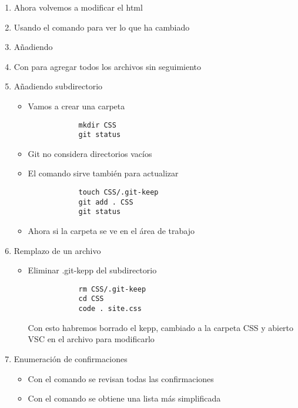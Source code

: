 \begin{enumerate}
\begin{itemize}
    \end{itemize}
    \item Ahora volvemos a modificar el html
    \item Usando el comando  para ver lo que ha cambiado
    \item Añadiendo 
    \item Con  para agregar todos los archivos sin seguimiento 
    \item Añadiendo subdirectorio
    \begin{itemize}
        \item Vamos a crear una carpeta
        \begin{verbatim}
            mkdir CSS
            git status
        \end{verbatim}
        \item Git no considera directorios vacíos 
        \item El comando  sirve también para actualizar 
        \begin{verbatim}
            touch CSS/.git-keep
            git add . CSS
            git status
        \end{verbatim}
        \item Ahora si la carpeta se ve en el área de trabajo
    \end{itemize}    
    \item Remplazo de un archivo 
    \begin{itemize}
        \item Eliminar .git-kepp del subdirectorio
        \begin{verbatim}
            rm CSS/.git-keep
            cd CSS
            code . site.css
        \end{verbatim}
        Con esto habremos borrado el kepp, cambiado a la carpeta CSS y abierto VSC en el archivo para modificarlo        
    \end{itemize}
    \item Enumeración de confirmaciones
    \begin{itemize}
        \item Con el comando  se revisan todas las confirmaciones
        \item Con el comando  se obtiene una lista más simplificada        
    \end{itemize}
\end{enumerate}

